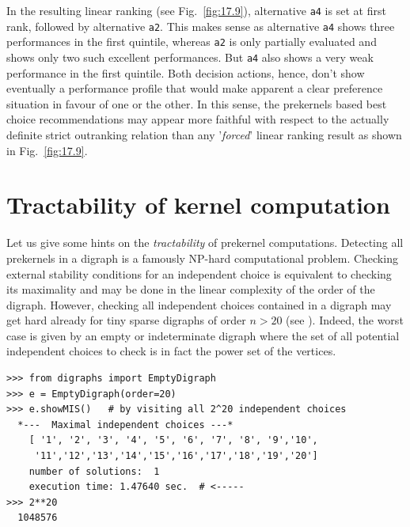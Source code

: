 In the resulting linear ranking (see Fig.~\vref{fig:17.9}), alternative \texttt{a4} is set at first rank, followed by alternative \texttt{a2}. This makes sense as alternative \texttt{a4} shows three performances in the first quintile, whereas \texttt{a2} is only partially evaluated and shows only two such excellent performances. But \texttt{a4} also shows a very weak performance in the first quintile. Both decision actions, hence, don't show eventually a performance profile that would make apparent a clear preference situation in favour of one or the other. In this sense, the prekernels based best choice recommendations may appear more faithful with respect to the actually definite strict outranking relation than any '\emph{forced}' linear ranking result as shown in Fig.~\vref{fig:17.9}.

\section{Tractability of kernel computation}
\label{sec:17.5}

Let us give some hints on the \emph{tractability} of prekernel computations. Detecting all prekernels in a digraph is a famously NP-hard computational problem. Checking external stability conditions for an independent choice is equivalent to checking its maximality and may be done in the linear complexity of the order of the digraph. However, checking all independent choices contained in a digraph may get hard already for tiny sparse digraphs of order $n > 20$ (see \citep{BIS-2006b}). Indeed, the worst case is given by an empty or indeterminate digraph where the set of all potential independent choices to check is in fact the power set of the vertices.
\begin{lstlisting}
>>> from digraphs import EmptyDigraph
>>> e = EmptyDigraph(order=20)
>>> e.showMIS()   # by visiting all 2^20 independent choices
  *---  Maximal independent choices ---*
    [ '1', '2', '3', '4', '5', '6', '7', '8', '9','10',
     '11','12','13','14','15','16','17','18','19','20']
    number of solutions:  1
    execution time: 1.47640 sec.  # <-----
>>> 2**20
  1048576
\end{lstlisting}

